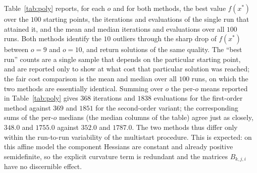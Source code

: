 \documentclass[11pt]{article}
\begin{document}
Table~\ref{tab:poly} reports, for each $o$ and for both methods, the best value
$f(x^*)$ over the $100$ starting points, the iterations and evaluations of the
single run that attained it, and the mean and median iterations and evaluations
over all $100$ runs. Both methods identify the $10$ outliers
through the sharp drop of $f(x^*)$ between $o=9$ and $o=10$, and return solutions
of the same quality. The ``best run'' counts are a single sample that depends on
the particular starting point, and are reported only to show at what cost that
particular solution was reached; the fair cost comparison is the mean and median over all
$100$ runs, on which the two methods are essentially identical. Summing over $o$
the per-$o$ means reported in
Table~\ref{tab:poly} gives $368$ iterations and $1838$ evaluations for the
first-order method against $369$ and $1851$ for the second-order variant; the
corresponding sums of the per-$o$ medians (the median columns of the table)
agree just as closely, $348.0$ and $1755.0$ against $352.0$ and $1787.0$. The two methods thus
differ only within the run-to-run variability of the multistart
procedure. This is expected: on this affine model the component Hessians are
constant and already positive semidefinite, so the explicit curvature term is
redundant and the matrices $B_{k,j,i}$ have no discernible effect.
\end{document}
